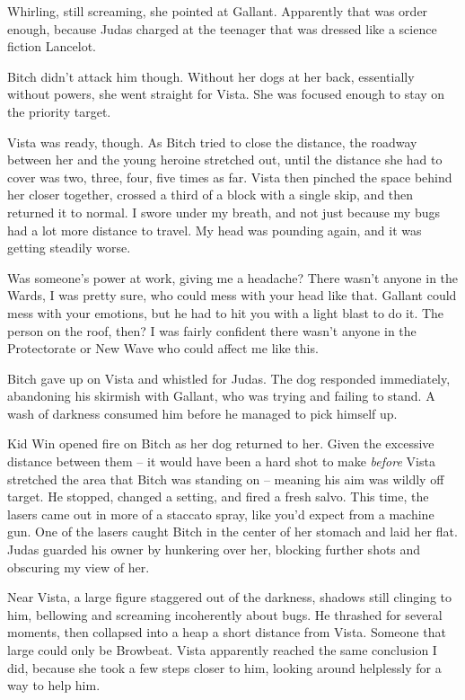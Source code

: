 Whirling, still screaming, she pointed at Gallant.  Apparently that was order enough, because Judas charged at the teenager that was dressed like a science fiction Lancelot.



Bitch didn't attack him though.  Without her dogs at her back, essentially without powers, she went straight for Vista.  She was focused enough to stay on the priority target.



Vista was ready, though.  As Bitch tried to close the distance, the roadway between her and the young heroine stretched out, until the distance she had to cover was two, three, four, five times as far.  Vista then pinched the space behind her closer together, crossed a third of a block with a single skip, and then returned it to normal.  I swore under my breath, and not just because my bugs had a lot more distance to travel.  My head was pounding again, and it was getting steadily worse.



Was someone's power at work, giving me a headache?  There wasn't anyone in the Wards, I was pretty sure, who could mess with your head like that.  Gallant could mess with your emotions, but he had to hit you with a light blast to do it.  The person on the roof, then?  I was fairly confident there wasn't anyone in the Protectorate or New Wave who could affect me like this.



Bitch gave up on Vista and whistled for Judas.  The dog responded immediately, abandoning his skirmish with Gallant, who was trying and failing to stand.  A wash of darkness consumed him before he managed to pick himself up.



Kid Win opened fire on Bitch as her dog returned to her.  Given the excessive distance between them – it would have been a hard shot to make \emph{before }Vista stretched the area that Bitch was standing on – meaning his aim was wildly off target.  He stopped, changed a setting, and fired a fresh salvo.  This time, the lasers came out in more of a staccato spray, like you'd expect from a machine gun.  One of the lasers caught Bitch in the center of her stomach and laid her flat.  Judas guarded his owner by hunkering over her, blocking further shots and obscuring my view of her.



Near Vista, a large figure staggered out of the darkness, shadows still clinging to him, bellowing and screaming incoherently about bugs.  He thrashed for several moments, then collapsed into a heap a short distance from Vista.  Someone that large could only be Browbeat.  Vista apparently reached the same conclusion I did, because she took a few steps closer to him, looking around helplessly for a way to help him.



